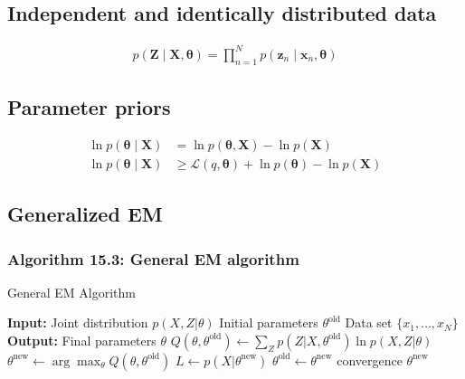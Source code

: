 \documentclass{article}
\begin{document}
\subsection{Independent and identically distributed data}

\begin{align*}
p(\mathbf{Z} \mid \mathbf{X}, \boldsymbol{\theta})=\prod_{n=1}^{N} p\left(\mathbf{z}_{n} \mid \mathbf{x}_{n}, \boldsymbol{\theta}\right)
\tag{15.57}
\end{align*}

\subsection{Parameter priors}

\begin{align*}
\ln p(\boldsymbol{\theta} \mid \mathbf{X}) & =\ln p(\boldsymbol{\theta}, \mathbf{X})-\ln p(\mathbf{X}) \tag{15.58}\\
\ln p(\boldsymbol{\theta} \mid \mathbf{X}) & \geqslant \mathcal{L}(q, \boldsymbol{\theta})+\ln p(\boldsymbol{\theta})-\ln p(\mathbf{X})
\tag{15.59}
\end{align*}

\subsection{Generalized EM}

\subsubsection{Algorithm 15.3: General EM algorithm}

\begin{algorithm}[H]
\caption{General EM Algorithm}
\begin{algorithmic}[1]
\STATE \textbf{Input:} Joint distribution $p(X, Z | \theta)$
\STATE \quad Initial parameters $\theta^{\text{old}}$
\STATE \quad Data set $\{x_1, \ldots, x_N\}$
\STATE \textbf{Output:} Final parameters $\theta$
\REPEAT
    \STATE $Q(\theta, \theta^{\text{old}}) \gets \sum_Z p(Z | X, \theta^{\text{old}}) \ln p(X, Z | \theta)$ 
    \STATE $\theta^{\text{new}} \gets \arg \max_\theta Q(\theta, \theta^{\text{old}})$ 
    \STATE $L \gets p(X | \theta^{\text{new}})$ 
    \STATE $\theta^{\text{old}} \gets \theta^{\text{new}}$ 
\UNTIL convergence
\RETURN $\theta^{\text{new}}$
\end{algorithmic}
\end{algorithm}
\end{document}
